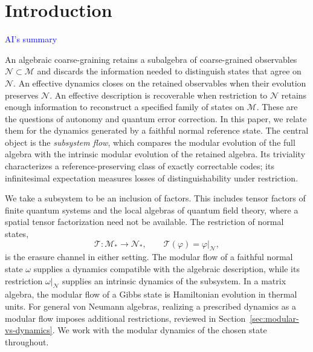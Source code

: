 \documentclass[a4paper,11pt]{article}
\theoremstyle{definition}
\newcommand{\NL}[1]{\textcolor{blue}{#1}}
\begin{document}
\maketitle
\section{Introduction}\label{sec:intro}


\NL{AI's summary}

An algebraic coarse-graining retains a subalgebra of coarse-grained observables $\mathcal N\subset\mathcal M$ and discards the information needed to distinguish states that agree on $\mathcal N$. An effective dynamics closes on the retained observables when their evolution preserves $\mathcal N$. An effective description is recoverable when restriction to $\mathcal N$ retains enough information to reconstruct a specified family of states on $\mathcal M$. These are the questions of autonomy and quantum error correction. In this paper, we relate them for the dynamics generated by a faithful normal reference state. The central object is the \emph{subsystem flow}, which compares the modular evolution of the full algebra with the intrinsic modular evolution of the retained algebra. Its triviality characterizes a reference-preserving class of exactly correctable codes; its infinitesimal expectation measures losses of distinguishability under restriction.

We take a subsystem to be an inclusion of factors. This includes tensor factors of finite quantum systems and the local algebras of quantum field theory, where a spatial tensor factorization need not be available. The restriction of normal states,
\begin{equation}
 \mathcal T:\mathcal M_*\longrightarrow\mathcal N_*,
 \qquad \mathcal T(\varphi)=\varphi|_{\mathcal N},
\end{equation}
is the erasure channel in either setting. The modular flow of a faithful normal state $\omega$ supplies a dynamics compatible with the algebraic description, while its restriction $\omega|_{\mathcal N}$ supplies an intrinsic dynamics of the subsystem. In a matrix algebra, the modular flow of a Gibbs state is Hamiltonian evolution in thermal units. For general von Neumann algebras, realizing a prescribed dynamics as a modular flow imposes additional restrictions, reviewed in Section~\ref{sec:modular-vs-dynamics}. We work with the modular dynamics of the chosen state throughout.
\end{document}
